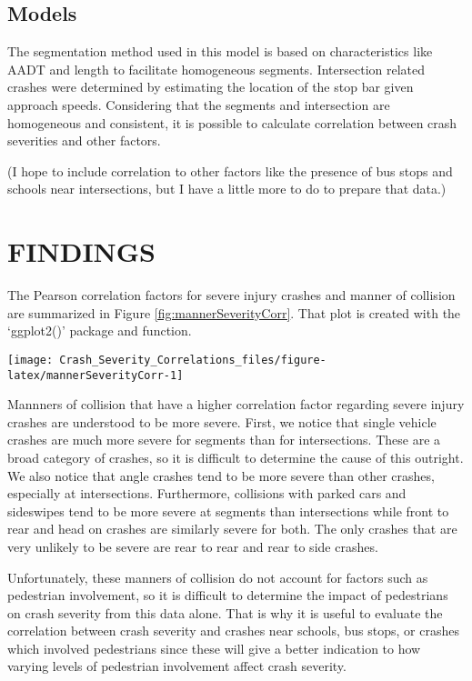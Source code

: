 \documentclass[3p, authoryear]{elsarticle} %
\begin{document}
\hypertarget{models}{%
\subsection{Models}\label{models}}

The segmentation method used in this model is based on characteristics like AADT and length to facilitate homogeneous segments. Intersection related crashes were determined by estimating the location of the stop bar given approach speeds. Considering that the segments and intersection are homogeneous and consistent, it is possible to calculate correlation between crash severities and other factors.

(I hope to include correlation to other factors like the presence of bus stops and schools near intersections, but I have a little more to do to prepare that data.)

\hypertarget{findings}{%
\section{FINDINGS}\label{findings}}

The Pearson correlation factors for severe injury crashes and manner of collision are summarized in Figure \ref{fig:mannerSeverityCorr}. That plot is created with the `ggplot2()' package and function.

\begin{center}\texttt{[image: Crash\_Severity\_Correlations\_files/figure-latex/mannerSeverityCorr-1]} \end{center}

Mannners of collision that have a higher correlation factor regarding severe injury crashes are understood to be more severe. First, we notice that single vehicle crashes are much more severe for segments than for intersections. These are a broad category of crashes, so it is difficult to determine the cause of this outright. We also notice that angle crashes tend to be more severe than other crashes, especially at intersections. Furthermore, collisions with parked cars and sideswipes tend to be more severe at segments than intersections while front to rear and head on crashes are similarly severe for both. The only crashes that are very unlikely to be severe are rear to rear and rear to side crashes.

Unfortunately, these manners of collision do not account for factors such as pedestrian involvement, so it is difficult to determine the impact of pedestrians on crash severity from this data alone. That is why it is useful to evaluate the correlation between crash severity and crashes near schools, bus stops, or crashes which involved pedestrians since these will give a better indication to how varying levels of pedestrian involvement affect crash severity.
\end{document}
